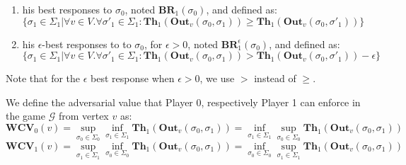 \begin{enumerate}
\item 
his best responses to $\sigma_0$, noted $\mathbf{BR}_1(\sigma_0)$, and defined as:
\begin{equation*}
    \{\sigma_1 \in \Sigma_1 | \forall v \in V . \forall \sigma'_1 \in \Sigma _1: \mathbf{Th}_1(\mathbf{Out}_v(\sigma_0,\sigma_1)) \geqslant \mathbf{Th}_1(\mathbf{Out}_v(\sigma_0,\sigma'_1))\}
\end{equation*}

\item \label{epsion_gt_0}
his $\epsilon$-best responses to to $\sigma_0$, for $\epsilon > 0$, noted $\mathbf{BR}^{\epsilon}_1(\sigma_0)$, and defined as:
\begin{equation*}
    \{\sigma_1 \in \Sigma_1 | \forall v \in V . \forall \sigma'_1 \in \Sigma _1: \mathbf{Th}_1(\mathbf{Out}_v(\sigma_0,\sigma_1)) > \mathbf{Th}_1(\mathbf{Out}_v(\sigma_0,\sigma'_1)) - \epsilon\}
\end{equation*}
\end{enumerate}
Note that for the $\epsilon$ best response when $\epsilon > 0$, we use $>$ instead of $\geqslant$.

We define the adversarial value that Player 0, respectively Player 1 can enforce in the game $\mathcal{G}$ from vertex $v$ as:
\begin{equation*}
    \mathbf{WCV}_0(v) = \sup\limits_{\sigma_0 \in \Sigma_0} \inf\limits_{\sigma_1 \in \Sigma_1} \mathbf{Th}_1(\mathbf{Out}_v(\sigma_0,\sigma_1)) = \inf\limits_{\sigma_1 \in \Sigma_1} \sup\limits_{\sigma_0 \in \Sigma_0} \mathbf{Th}_1(\mathbf{Out}_v(\sigma_0,\sigma_1))
\end{equation*}
\begin{equation*}
    \mathbf{WCV}_1(v) = \sup\limits_{\sigma_1 \in \Sigma_1} \inf\limits_{\sigma_0 \in \Sigma_0} \mathbf{Th}_1(\mathbf{Out}_v(\sigma_0,\sigma_1)) = \inf\limits_{\sigma_0 \in \Sigma_0} \sup\limits_{\sigma_1 \in \Sigma_1} \mathbf{Th}_1(\mathbf{Out}_v(\sigma_0,\sigma_1))
\end{equation*}

